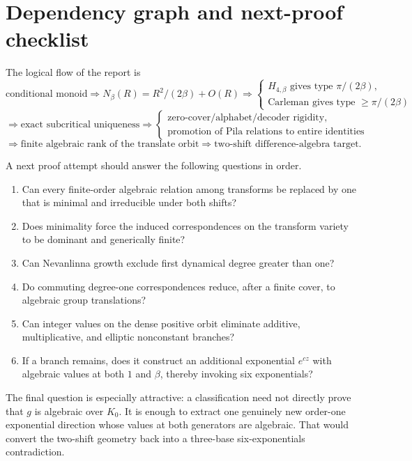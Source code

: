 \documentclass[11pt,oneside]{article}
\theoremstyle{definition}
\theoremstyle{remark}
\begin{document}
\section{Dependency graph and next-proof checklist}
\label{app:dependency}

The logical flow of the report is
\[
 \boxed{\text{conditional monoid}}
 \Longrightarrow
 \boxed{N_\beta(R)=R^2/(2\beta)+O(R)}
 \Longrightarrow
 \begin{cases}
  \boxed{H_{4,\beta}\text{ gives type }\pi/(2\beta)},\\
  \boxed{\text{Carleman gives type }\ge\pi/(2\beta)}
 \end{cases}
\]
\[
 \Longrightarrow
 \boxed{\text{exact subcritical uniqueness}}
 \Longrightarrow
 \begin{cases}
  \boxed{\text{zero-cover/alphabet/decoder rigidity}},\\
  \boxed{\text{promotion of Pila relations to entire identities}}
 \end{cases}
\]
\[
 \Longrightarrow
 \boxed{\text{finite algebraic rank of the translate orbit}}
 \Longrightarrow
 \boxed{\text{two-shift difference-algebra target}}.
\]

A next proof attempt should answer the following questions in order.

\begin{enumerate}
\item Can every finite-order algebraic relation among transforms be replaced by one that is
minimal and irreducible under both shifts?
\item Does minimality force the induced correspondences on the transform variety to be
dominant and generically finite?
\item Can Nevanlinna growth exclude first dynamical degree greater than one?
\item Do commuting degree-one correspondences reduce, after a finite cover, to algebraic
group translations?
\item Can integer values on the dense positive orbit eliminate additive, multiplicative,
and elliptic nonconstant branches?
\item If a branch remains, does it construct an additional exponential $e^{cz}$ with
algebraic values at both $1$ and $\beta$, thereby invoking six exponentials?
\end{enumerate}

The final question is especially attractive: a classification need not directly prove that
$g$ is algebraic over $K_0$.  It is enough to extract one genuinely new order-one
exponential direction whose values at both generators are algebraic.  That would convert the
two-shift geometry back into a three-base six-exponentials contradiction.
\end{document}
